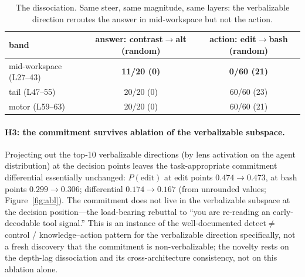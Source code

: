 \documentclass[11pt]{article}
\begin{document}
\begin{table}[h]\centering\small
\begin{tabular}{lcc}
\toprule
band & answer: contrast$\rightarrow$alt (random) & action: edit$\rightarrow$bash (random) \\
\midrule
mid-workspace (L27--43) & \textbf{11/20 (0)} & \textbf{0/60 (21)} \\
tail (L47--55)          & 20/20 (0) & 60/60 (23) \\
motor (L59--63)         & 20/20 (0) & 60/60 (21) \\
\bottomrule
\end{tabular}
\caption{The dissociation. Same steer, same magnitude, same layers: the verbalizable direction
reroutes the answer in mid-workspace but not the action.}
\label{tab:dissoc}
\end{table}

\paragraph{H3: the commitment survives ablation of the verbalizable subspace.}
Projecting out the top-10 verbalizable directions (by lens activation on the agent distribution) at
the decision points leaves the task-appropriate commitment differential essentially unchanged:
$P(\text{edit})$ at edit points $0.474\rightarrow0.473$, at bash points $0.299\rightarrow0.306$;
differential $0.174\rightarrow0.167$ (from unrounded values; Figure~\ref{fig:abl}). The commitment does not live in the
verbalizable subspace at the decision position---the load-bearing rebuttal to ``you are re-reading an
early-decodable tool signal.'' This is an instance of the well-documented detect$\neq$control /
knowledge--action pattern \citep{basu2026gap} for the verbalizable direction specifically, not a fresh
discovery that the commitment is non-verbalizable; the novelty rests on the depth-lag dissociation and
its cross-architecture consistency, not on this ablation alone.
\end{document}
